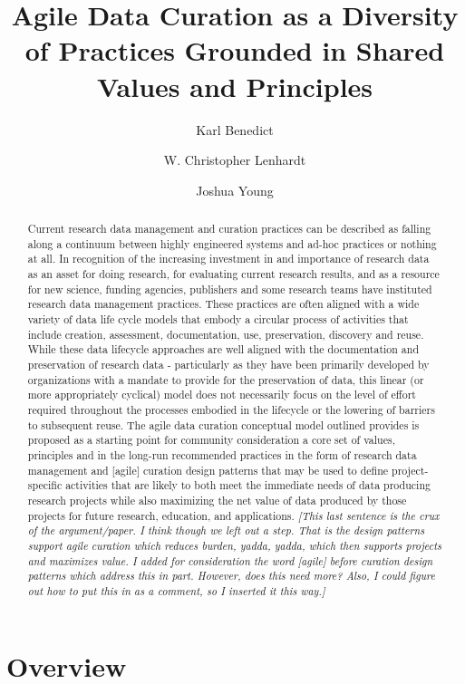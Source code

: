 \documentclass[paper]{ijdc-v9}
\title[Agile Data Curation]{Agile Data Curation as a Diversity of Practices Grounded in Shared
Values and Principles}
\author{Karl Benedict}
\affil{University of New Mexico}
\author{W. Christopher Lenhardt}
\affil{Renaissance Computing Institute}
\author{Joshua Young}
\affil{University Corporation for Atmospheric Research}
\begin{document}
\maketitle

\begin{abstract}
Current research data management and curation practices can be described
as falling along a continuum between highly engineered systems and
ad-hoc practices or nothing at all. In recognition of the increasing
investment in and importance of research data as an asset for doing
research, for evaluating current research results, and as a resource for
new science, funding agencies, publishers and some research teams have
instituted research data management practices. These practices are often
aligned with a wide variety of data life cycle models that embody a
circular process of activities that include creation, assessment,
documentation, use, preservation, discovery and reuse. While these data
lifecycle approaches are well aligned with the documentation and
preservation of research data - particularly as they have been primarily
developed by organizations with a mandate to provide for the
preservation of data, this linear (or more appropriately cyclical) model
does not necessarily focus on the level of effort required throughout
the processes embodied in the lifecycle or the lowering of barriers to
subsequent reuse. The agile data curation conceptual model outlined
provides is proposed as a starting point for community consideration a
core set of values, principles and in the long-run recommended practices
in the form of research data management and {[}agile{]} curation design
patterns that may be used to define project-specific activities that are
likely to both meet the immediate needs of data producing research
projects while also maximizing the net value of data produced by those
projects for future research, education, and applications. \emph{{[}This
last sentence is the crux of the argument/paper. I think though we left
out a step. That is the design patterns support agile curation which
reduces burden, yadda, yadda, which then supports projects and maximizes
value. I added for consideration the word {[}agile{]} before curation
design patterns which address this in part. However, does this need
more? Also, I could figure out how to put this in as a comment, so I
inserted it this way.{]}}
\end{abstract}

\section{Overview}\label{overview}
\end{document}
